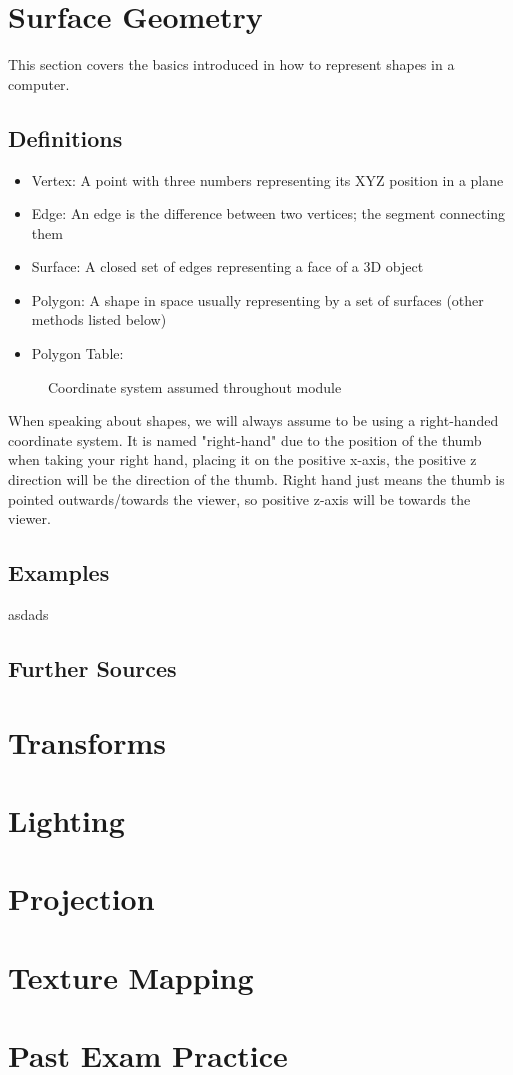 \section{Surface Geometry}
This section covers the basics introduced in how to represent shapes in a computer.
\subsection{Definitions}
\begin{itemize}
	\item Vertex: A point with three numbers representing its XYZ position in a plane
	\item Edge: An edge is the difference between two vertices; the segment connecting them
	\item Surface: A closed set of edges representing a face of a 3D object
	\item Polygon: A shape in space usually representing by a set of surfaces (other methods listed below)
	\item Polygon Table: 
\end{itemize}
   \begin{figure}[!htb]
	\caption{\label{fig:my-label} Coordinate system assumed throughout module}
\end{figure}
When speaking about shapes, we will always assume to be using a right-handed coordinate system. It is named "right-hand" due to the position of the thumb when taking your right hand, placing it on the positive x-axis, the positive z direction will be the direction of the thumb. Right hand just means the thumb is pointed outwards/towards the viewer, so positive z-axis will be towards the viewer.
\newline
\subsection{Examples}
asdads
\subsection{Further Sources}

\newpage
\section{Transforms}
\newpage
\section{Lighting}
\newpage
\section{Projection}
\newpage
\section{Texture Mapping}
\newpage
\section{Past Exam Practice}